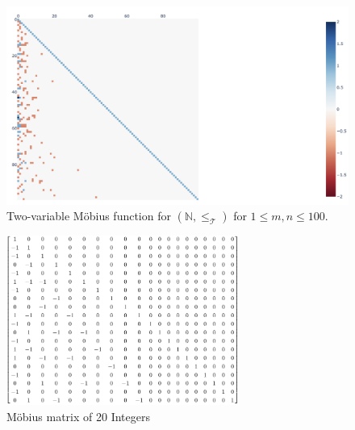 \documentclass{amsart}
\theoremstyle{definition}
\newcommand{\NN}{\mathbb{N}}
\newcommand{\Mobius}{M\"obius}
\newcommand{\leqtri}{\leq_{\tri}}
\newcommand{\tri}{\mathcal T}
\begin{document}


\begin{figure}[h!]
    \centering
    \includegraphics[width= 6in]{Plotly_Tri_Numb.png}
    \caption{Two-variable \Mobius{} function for $(\NN, \leqtri)$ for $1 \leq m, n \leq 100$.}
    \label{fig:mobius-heatmap-tri}
\end{figure}


\begin{figure}[h!]
    \centering
    \includegraphics[width = 3in]{Mobius_Matrix_20_Integers.PNG}
    \caption{\Mobius{} matrix of 20 Integers}
    \label{fig:mobius-matrix-classical-20}
\end{figure}
\end{document}
